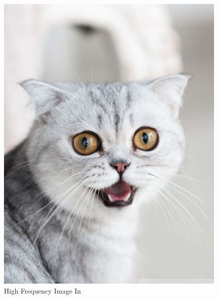 \documentclass{article}
\begin{document}
\begin{figure}[!htb]
    \includegraphics[width=\linewidth]{cat.jpeg}
    \caption{High Frequency Image In}\label{fig:awesome_image2}
\endminipage
{}

\end{figure}
\end{document}
